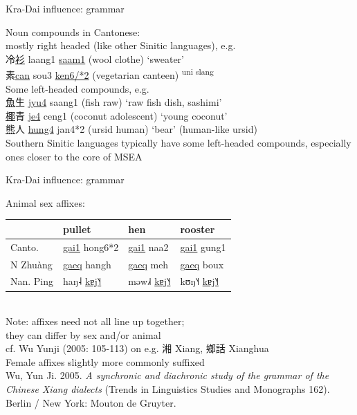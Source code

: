 \documentclass{beamer}
\begin{document}
\begin{frame}[fragile]{Kra-Dai influence: grammar}

Noun compounds in Cantonese:\\ 
\smallskip
mostly right headed (like other Sinitic languages), e.g.\\
冷\underline{衫} laang1 \underline{saam1} (wool clothe) \enquote*{sweater}\\
素\underline{can} sou3 \underline{ken6/*2} (vegetarian canteen) \textsuperscript{uni slang}\\
\medskip
Some left-headed compounds, e.g.\\
\underline{魚}生 \underline{jyu4} saang1 (fish raw) \enquote*{raw fish dish, sashimi}\\ 
\underline{椰}青 \underline{je4} ceng1 (coconut adolescent) \enquote*{young coconut}\\
\underline{熊}人 \underline{hung4} jan4*2 (ursid human) \enquote*{bear} (human-like ursid)\\
\bigskip
{\scriptsize Southern Sinitic languages typically have some left-headed compounds, especially ones closer to the core of MSEA}

\end{frame}

\begin{frame}[fragile]{Kra-Dai influence: grammar}

{\small
Animal sex affixes:\\
\medskip
    \begin{tabular}{l|l l l}
        & pullet & hen & rooster\\ \hline
        Canto. & \underline{gai1} hong6*2 & \underline{gai1} naa2 & \underline{gai1} gung1\\
        N Zhuàng & \underline{gaeq} hangh & \underline{gaeq} meh & \underline{gaeq} boux\\
        Nan. Ping & haŋ˨ \underline{kɐj˥˧} & məw˩˧ \underline{kɐj˥˧} & kʊŋ˥˧ \underline{kɐj˥˧}\\
    \end{tabular}\\
\bigskip
Note: affixes need not all line up together;\\
\quad they can differ by sex and/or animal\\
cf. Wu Yunji (2005: 105-113) on e.g. 湘 Xiang, 鄉話 Xianghua\\
\quad Female affixes slightly more commonly suffixed\\

\vfill {} {\tiny Wu, Yun Ji. 2005. \textit{A synchronic and diachronic study of the grammar of the Chinese Xiang dialects} (Trends in Linguistics Studies and Monographs 162). Berlin / New York: Mouton de Gruyter.} \par
}

\end{frame}
\end{document}

